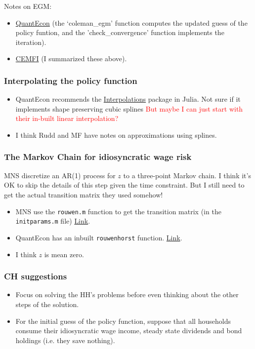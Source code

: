 \documentclass[12pt]{article}
\begin{document}
Notes on EGM:
\begin{itemize}
\item \href{https://lectures.quantecon.org/jl/egm_policy_iter.html}{QuantEcon} (the `coleman\_egm' function computes the updated guess of the policy funtion, and the 'check\_convergence' function implements the iteration).
\item \href{https://www.cemfi.es/~pijoan/Teaching_files/Notes%20on%20endogenous%20grid%20method.pdf}{CEMFI} (I summarized these above).
\end{itemize}


\subsubsection{Interpolating the policy function}
\begin{itemize}
\item QuantEcon recommends the \href{https://github.com/JuliaMath/Interpolations.jl}{Interpolations} package in Julia. Not sure if it implements shape preserving cubic splines \textcolor{red}{But maybe I can just start with their in-built linear interpolation?}
\item I think Rudd and MF have notes on approximations using splines.
\end{itemize}

\subsubsection{The Markov Chain for idiosyncratic wage risk}
MNS discretize an AR(1) process for $z$ to a three-point Markov chain. I think it's OK to skip the details of this step given the time constraint. But I still need to get the actual transition matrix they used somehow!
\begin{itemize}
\item MNS use the \verb|rouwen.m| function to get the transition matrix (in the \verb|initparams.m| file) \href{https://sites.google.com/site/dlkhagva/research/matlab-codes-for-the-rouwenhorst-method}{Link}.
\item QuantEcon has an inbuilt \verb|rouwenhorst| function. \href{https://github.com/QuantEcon/QuantEcon.jl/blob/master/src/markov/markov_approx.jl}{Link}.
\item I think $z$ is mean zero.
\end{itemize}

\subsubsection{CH suggestions}
\begin{itemize}
\item Focus on solving the HH's problems before even thinking about the other steps of the solution.
\item For the initial guess of the policy function, suppose that all households consume their idiosyncratic wage income, steady state dividends and bond holdings (i.e. they save nothing). 
\end{itemize}
\end{document}
